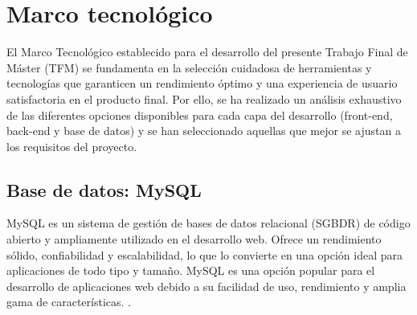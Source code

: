 
\chapter{Marco tecnológico}\label{cap:cap3}
El Marco Tecnológico establecido para el desarrollo del presente Trabajo Final de Máster (TFM) se fundamenta en la selección cuidadosa de herramientas y tecnologías que garanticen un rendimiento óptimo y una experiencia de usuario satisfactoria en el producto final. Por ello, se ha realizado un análisis exhaustivo de las diferentes opciones disponibles para cada capa del desarrollo (front-end, back-end y base de datos) y se han seleccionado aquellas que mejor se ajustan a los requisitos del proyecto.

\section{Base de datos: MySQL}\label{sec:sec3.1}

MySQL es un sistema de gestión de bases de datos relacional (SGBDR) de código abierto y ampliamente utilizado en el desarrollo web. Ofrece un rendimiento sólido, confiabilidad y escalabilidad, lo que lo convierte en una opción ideal para aplicaciones de todo tipo y tamaño. MySQL es una opción popular para el desarrollo de aplicaciones web debido a su facilidad de uso, rendimiento y amplia gama de características. \cite{mysql, elmasri, relational_vs_nosql}.

\vspace{0.5cm}

